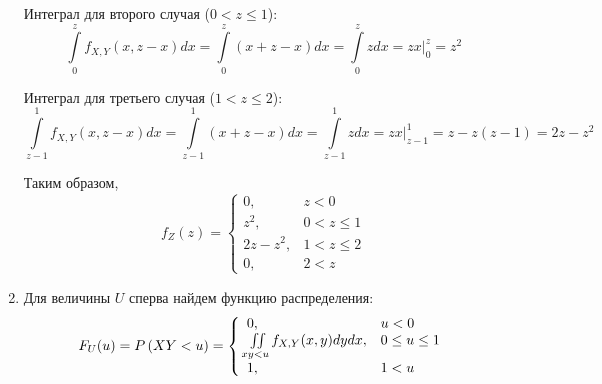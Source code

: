 \begin{enumerate}
    Интеграл для второго случая ($0 < z \le 1$):
    \begin{equation}
        \int \limits_0^z f_{X,Y}(x,z-x) dx
        = \int \limits_0^z \left ( x + z - x \right ) dx
        = \int \limits_0^z z dx
        = \left . z x \right |_0^z
        = z^2
    \end{equation}

    Интеграл для третьего случая ($1 < z \le 2$):
    \begin{equation}
        \int \limits_{z-1}^1 f_{X,Y}(x,z-x) dx
        = \int \limits_{z-1}^1 \left ( x + z - x \right ) dx
        = \int \limits_{z-1}^1 z dx
        = \left . z x \right |_{z-1}^1
        = z - z (z - 1)
        = 2 z - z^2
    \end{equation}

    Таким образом,
    \begin{equation}
        f_Z(z)
        = \left \{
        \begin{array}{ll}
            0,        & z < 0       \\
            z^2,      & 0 < z \le 1 \\
            2z - z^2, & 1 < z \le 2 \\
            0,        & 2 < z
        \end{array}
        \right .
    \end{equation}

    \item Для величины $U$ сперва найдем функцию распределения:
    \begin{equation}
        F_U(u)
        = P \left ( XY < u \right )
        = \left \{
        \begin{array}{ll}
            0,                                          & u < 0         \\
            \iint \limits_{xy < u} f_{X,Y}(x, y) dy dx, & 0 \le u \le 1 \\
            1,                                          & 1 < u
        \end{array}
        \right .
    \end{equation}


\end{enumerate}

